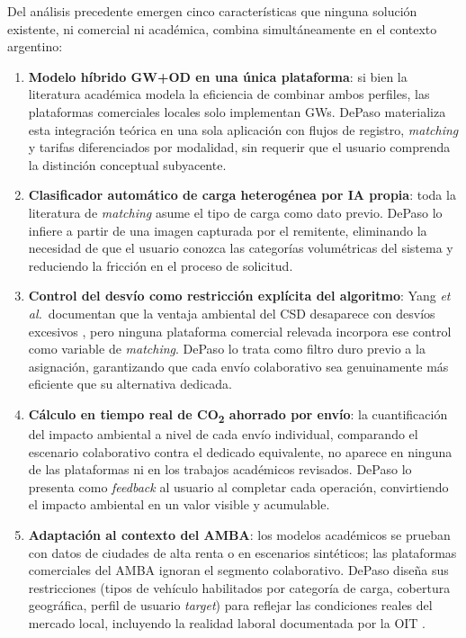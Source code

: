 Del análisis precedente emergen cinco características que ninguna solución existente, ni comercial ni académica, combina simultáneamente en el contexto argentino:

\begin{enumerate}[leftmargin=2em]
    \item \textbf{Modelo híbrido GW+OD en una única plataforma}: si bien la literatura académica modela la eficiencia de combinar ambos perfiles, las plataformas comerciales locales solo implementan GWs. DePaso materializa esta integración teórica en una sola aplicación con flujos de registro, \emph{matching} y tarifas diferenciados por modalidad, sin requerir que el usuario comprenda la distinción conceptual subyacente.
    \item \textbf{Clasificador automático de carga heterogénea por IA propia}: toda la literatura de \emph{matching} asume el tipo de carga como dato previo. DePaso lo infiere a partir de una imagen capturada por el remitente, eliminando la necesidad de que el usuario conozca las categorías volumétricas del sistema y reduciendo la fricción en el proceso de solicitud.
    \item \textbf{Control del desvío como restricción explícita del algoritmo}: Yang \textit{et al.}\ documentan que la ventaja ambiental del CSD desaparece con desvíos excesivos \parencite{YangEtAl2022}, pero ninguna plataforma comercial relevada incorpora ese control como variable de \emph{matching}. DePaso lo trata como filtro duro previo a la asignación, garantizando que cada envío colaborativo sea genuinamente más eficiente que su alternativa dedicada.
    \item \textbf{Cálculo en tiempo real de CO\textsubscript{2} ahorrado por envío}: la cuantificación del impacto ambiental a nivel de cada envío individual, comparando el escenario colaborativo contra el dedicado equivalente, no aparece en ninguna de las plataformas ni en los trabajos académicos revisados. DePaso lo presenta como \emph{feedback} al usuario al completar cada operación, convirtiendo el impacto ambiental en un valor visible y acumulable.
    \item \textbf{Adaptación al contexto del AMBA}: los modelos académicos se prueban con datos de ciudades de alta renta o en escenarios sintéticos; las plataformas comerciales del AMBA ignoran el segmento colaborativo. DePaso diseña sus restricciones (tipos de vehículo habilitados por categoría de carga, cobertura geográfica, perfil de usuario \emph{target}) para reflejar las condiciones reales del mercado local, incluyendo la realidad laboral documentada por la OIT \parencite{OIT2020}.
\end{enumerate}

